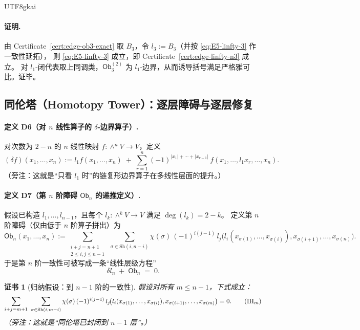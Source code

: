 \documentclass[12pt]{article}
\newtheorem{Certificate}{证书}[section]
\newcommand{\Ob}{\ensuremath{\mathsf{Ob}}}
\begin{document}
\begin{CJK*}{UTF8}{gkai}
\paragraph{证明.}
由 Certificate~\ref{cert:edge-ob3-exact} 取 $B_3$，令 $l_3:=B_3$（并按 \eqref{eq:E5-linfty-3} 作一致性延拓），
则 \eqref{eq:E5-linfty-3} 成立，即 Certificate~\ref{cert:edge-linfty-n3} 成立。
对 $l_1$-闭代表取上同调类，$\Ob_3^{(2)}$ 为 $l_1$-边界，从而诱导括号满足严格雅可比。证毕。

\subsection{同伦塔（Homotopy Tower）：逐层障碍与逐层修复}
\label{subsec:edge-op-homotopy-tower}

\paragraph{定义 D6（对 $n$ 线性算子的 $\delta$-边界算子）.}
对次数为 $2-n$ 的 $n$ 线性映射 $f:\wedge^nV\to V$，定义
\[
(\delta f)(x_1,\dots,x_n)
:=
l_1 f(x_1,\dots,x_n)
\;+\;
\sum_{r=1}^n (-1)^{|x_1|+\cdots+|x_{r-1}|}\,
f(x_1,\dots,l_1x_r,\dots,x_n).
\tag{E6}
\label{eq:E6-delta}
\]
（旁注：这就是“只看 $l_1$ 时”的链复形边界算子在多线性层面的提升。）

\paragraph{定义 D7（第 $n$ 阶障碍 $\Ob_n$ 的递推定义）.}
假设已构造 $l_1,\dots,l_{n-1}$，且每个 $l_k:\wedge^kV\to V$ 满足 $\deg(l_k)=2-k$。
定义第 $n$ 阶障碍（仅由低于 $n$ 阶算子拼出）为
\[
\Ob_n(x_1,\dots,x_n)
:=
\sum_{\substack{i+j=n+1\\ 2\le i,j\le n-1}}
\ \sum_{\sigma\in\mathrm{Sh}(i,n-i)}
\chi(\sigma)\,(-1)^{i(j-1)}\,
l_j\!\bigl(l_i(x_{\sigma(1)},\dots,x_{\sigma(i)}),x_{\sigma(i+1)},\dots,x_{\sigma(n)}\bigr).
\tag{E7}
\label{eq:E7-obn-rec}
\]
于是第 $n$ 阶一致性可被写成一条“线性层级方程”
\[
\delta l_n \;+\;\Ob_n \;=\;0.
\tag{E8}
\label{eq:E8-level-n}
\]

\begin{Certificate}[归纳假设：到 $n-1$ 阶的一致性]
\label{cert:edge-tower-ih}
假设对所有 $m\le n-1$，下式成立：
\[
\sum_{i+j=m+1}\ \sum_{\sigma\in\mathrm{Sh}(i,m-i)}
\chi(\sigma)\,(-1)^{i(j-1)}\,
l_j\!\bigl(l_i(x_{\sigma(1)},\dots,x_{\sigma(i)}),x_{\sigma(i+1)},\dots,x_{\sigma(m)}\bigr)=0.
\tag{IH$_{m}$}
\label{eq:IH-m}
\]
（旁注：这就是“同伦塔已封闭到 $n-1$ 层”。）
\end{Certificate}


\end{CJK*}
\end{document}
